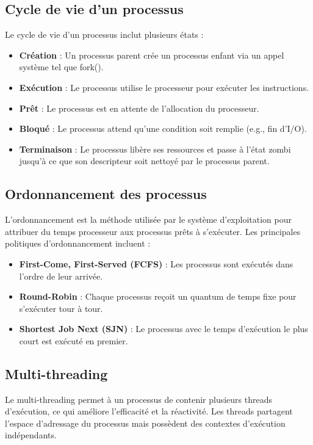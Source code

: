 \subsection{Cycle de vie d'un processus}
Le cycle de vie d'un processus inclut plusieurs états :
\begin{itemize}
    \item \textbf{Création} : Un processus parent crée un processus enfant via un appel système tel que fork().
    \item \textbf{Exécution} : Le processus utilise le processeur pour exécuter les instructions.
    \item \textbf{Prêt} : Le processus est en attente de l'allocation du processeur.
    \item \textbf{Bloqué} : Le processus attend qu'une condition soit remplie (e.g., fin d'I/O).
    \item \textbf{Terminaison} : Le processus libère ses ressources et passe à l'état zombi jusqu'à ce que son descripteur soit nettoyé par le processus parent.
\end{itemize}

\subsection{Ordonnancement des processus}
L'ordonnancement est la méthode utilisée par le système d'exploitation pour attribuer du temps processeur aux processus prêts à s'exécuter. 
Les principales politiques d'ordonnancement incluent :
\begin{itemize}
    \item \textbf{First-Come, First-Served (FCFS)} : Les processus sont exécutés dans l'ordre de leur arrivée.
    \item \textbf{Round-Robin} : Chaque processus reçoit un quantum de temps fixe pour s'exécuter tour à tour.
    \item \textbf{Shortest Job Next (SJN)} : Le processus avec le temps d'exécution le plus court est exécuté en premier.
\end{itemize}

\subsection{Multi-threading}
Le multi-threading permet à un processus de contenir plusieurs threads d'exécution, ce qui améliore l'efficacité et la réactivité. Les threads partagent l'espace d'adressage du processus mais possèdent des contextes d'exécution indépendants.

